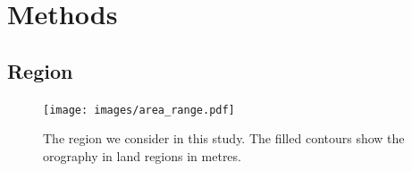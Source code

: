 \documentclass{article}
\begin{document}



\section{Methods}
\label{sec:methods}

\subsection{Region}


\begin{figure}[t]
    \centering
    \texttt{[image: images/area\_range.pdf]}
    
    \caption{The region we consider in this study. The filled contours show the orography in land regions in metres.}
    \label{fig:region}
\end{figure}
\end{document}
